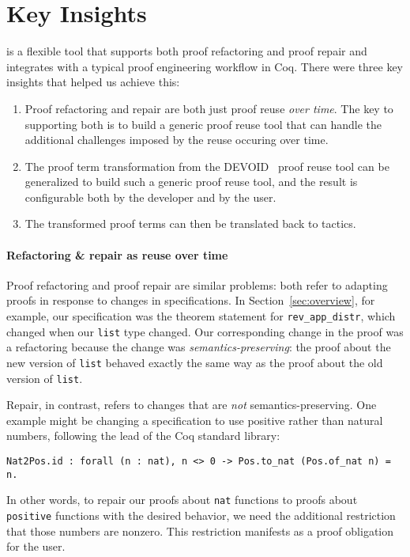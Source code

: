 \section{Key Insights}
\label{sec:key}

\toolname is a flexible tool that supports both proof refactoring and proof repair and integrates
with a typical proof engineering workflow in Coq.
There were three key insights that helped us achieve this:

\begin{enumerate}
\item Proof refactoring and repair are both just 
proof reuse %
\textit{over time}. The key to supporting both is to build a generic proof reuse
tool that can handle the additional challenges imposed by the reuse occuring over time. 
\item The proof term transformation from the \textsc{DEVOID}~\cite{Ringer2019} proof reuse tool can be generalized
to build such a generic proof reuse tool, and the result is configurable both by the developer and by the user.
\item The transformed proof terms can then be translated back to tactics.
\end{enumerate}

\paragraph{Refactoring \& repair as reuse over time}

Proof refactoring and proof repair are similar problems: both refer to adapting proofs in response to changes
in specifications. In Section~\ref{sec:overview}, for example, our specification was the theorem statement
for \lstinline{rev_app_distr}, which changed when our \lstinline{list} type changed.
Our corresponding change in the proof was a refactoring because the change was \textit{semantics-preserving}:
the proof about the new version of \lstinline{list} behaved exactly the same way as the proof about the old
version of \lstinline{list}.

Repair, in contrast, refers to changes that are \textit{not} semantics-preserving.
One example might be changing a specification to use positive rather than natural numbers, %
following the lead of the Coq standard library:

\begin{lstlisting}
Nat2Pos.id : forall (n : nat), n <> 0 -> Pos.to_nat (Pos.of_nat n) = n.
\end{lstlisting}
In other words, to repair our proofs about \lstinline{nat} functions to proofs about \lstinline{positive} functions with the desired behavior,
we need the additional restriction that those numbers are nonzero. 
This restriction manifests as a proof obligation for the user.

